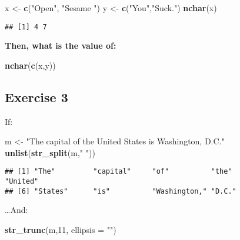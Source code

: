 \documentclass[]{article}
\newenvironment{Shaded}{\begin{snugshade}}{\end{snugshade}}
\newcommand{\DataTypeTok}[1]{\textcolor[rgb]{0.13,0.29,0.53}{#1}}
\newcommand{\DecValTok}[1]{\textcolor[rgb]{0.00,0.00,0.81}{#1}}
\newcommand{\KeywordTok}[1]{\textcolor[rgb]{0.13,0.29,0.53}{\textbf{#1}}}
\newcommand{\NormalTok}[1]{#1}
\newcommand{\StringTok}[1]{\textcolor[rgb]{0.31,0.60,0.02}{#1}}
\begin{document}
\begin{Shaded}
\begin{Highlighting}[]
\NormalTok{x <-}\StringTok{ }\KeywordTok{c}\NormalTok{(}\StringTok{"Open"}\NormalTok{, }\StringTok{"Sesame "}\NormalTok{)}
\NormalTok{y <-}\StringTok{ }\KeywordTok{c}\NormalTok{(}\StringTok{"You"}\NormalTok{,}\StringTok{"Suck."}\NormalTok{)}
\KeywordTok{nchar}\NormalTok{(x)}
\end{Highlighting}
\end{Shaded}

\begin{verbatim}
## [1] 4 7
\end{verbatim}

\textbf{Then, what is the value of:}

\begin{Shaded}
\begin{Highlighting}[]
\KeywordTok{nchar}\NormalTok{(}\KeywordTok{c}\NormalTok{(x,y))}
\end{Highlighting}
\end{Shaded}

\hypertarget{exercise-3}{%
\subsection{Exercise 3}\label{exercise-3}}

If:

\begin{Shaded}
\begin{Highlighting}[]
\NormalTok{m <-}\StringTok{ "The capital of the United States is Washington, D.C."}
\KeywordTok{unlist}\NormalTok{(}\KeywordTok{str_split}\NormalTok{(m,}\StringTok{" "}\NormalTok{))}
\end{Highlighting}
\end{Shaded}

\begin{verbatim}
## [1] "The"         "capital"     "of"          "the"         "United"     
## [6] "States"      "is"          "Washington," "D.C."
\end{verbatim}

\ldots{}And:

\begin{Shaded}
\begin{Highlighting}[]
\KeywordTok{str_trunc}\NormalTok{(m,}\DecValTok{11}\NormalTok{, }\DataTypeTok{ellipsis =} \StringTok{""}\NormalTok{)}
\end{Highlighting}
\end{Shaded}
\end{document}

